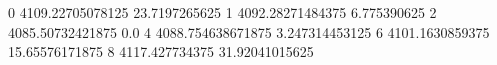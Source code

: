 0 4109.22705078125 23.7197265625
1 4092.28271484375 6.775390625
2 4085.50732421875 0.0
4 4088.754638671875 3.247314453125
6 4101.1630859375 15.65576171875
8 4117.427734375 31.92041015625
